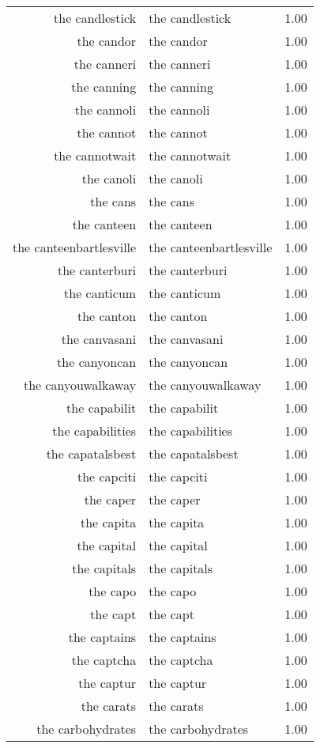 \begin{table}[ht]
\begin{tabular}{rlr}
  the candlestick & the candlestick & 1.00 \\ 
  the candor & the candor & 1.00 \\ 
  the canneri & the canneri & 1.00 \\ 
  the canning & the canning & 1.00 \\ 
  the cannoli & the cannoli & 1.00 \\ 
  the cannot & the cannot & 1.00 \\ 
  the cannotwait & the cannotwait & 1.00 \\ 
  the canoli & the canoli & 1.00 \\ 
  the cans & the cans & 1.00 \\ 
  the canteen & the canteen & 1.00 \\ 
  the canteenbartlesville & the canteenbartlesville & 1.00 \\ 
  the canterburi & the canterburi & 1.00 \\ 
  the canticum & the canticum & 1.00 \\ 
  the canton & the canton & 1.00 \\ 
  the canvasani & the canvasani & 1.00 \\ 
  the canyoncan & the canyoncan & 1.00 \\ 
  the canyouwalkaway & the canyouwalkaway & 1.00 \\ 
  the capabilit & the capabilit & 1.00 \\ 
  the capabilities & the capabilities & 1.00 \\ 
  the capatalsbest & the capatalsbest & 1.00 \\ 
  the capciti & the capciti & 1.00 \\ 
  the caper & the caper & 1.00 \\ 
  the capita & the capita & 1.00 \\ 
  the capital & the capital & 1.00 \\ 
  the capitals & the capitals & 1.00 \\ 
  the capo & the capo & 1.00 \\ 
  the capt & the capt & 1.00 \\ 
  the captains & the captains & 1.00 \\ 
  the captcha & the captcha & 1.00 \\ 
  the captur & the captur & 1.00 \\ 
  the carats & the carats & 1.00 \\ 
  the carbohydrates & the carbohydrates & 1.00 \\ 

\end{tabular}
\end{table}
